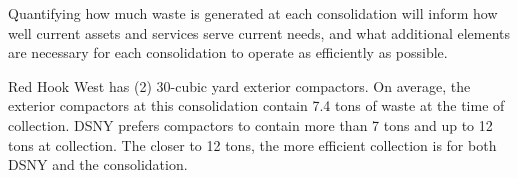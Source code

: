 
    Quantifying how much waste is generated at each consolidation will inform how well current assets and services serve current needs, and what additional elements are necessary for each consolidation to operate as efficiently as possible.
    
    Red Hook West has (2) 30-cubic yard exterior compactors. On average, the exterior compactors at this consolidation contain 7.4 tons of waste at the time of collection. DSNY prefers compactors to contain more than 7 tons and up to 12 tons at collection. The closer to 12 tons, the more efficient collection is for both DSNY and the consolidation.